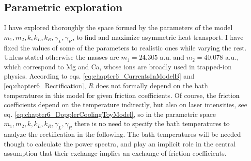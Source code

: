 \subsection{Parametric exploration}
%
%
%
I have explored thoroughly the space formed by the parameters of the model $m_1,m_2,k,k_L,k_R,\gamma_L,\gamma_R$, to find
and maximize asymmetric heat transport. I have fixed the values of some of the parameters to realistic ones while varying the rest. Unless stated otherwise the masses are
$m_1 = 24.305$ a.u. and $m_2 = 40.078$ a.u., which correspond to Mg and Ca, whose ions are broadly used in trapped-ion physics. According to eqs. \eqref{eq:chapter6_CurrentsInModelB} and \eqref{eq:chapter6_Rectification}, $R$ does not formally depend on the bath temperatures in this model for given friction coefficients. Of course, the friction coefficients depend on the temperature indirectly, but also on laser intensities, see eq. \eqref{eq:chapter6_DopplerCoolingToyModel}, so in the parametric space $m_1,m_2,k,k_L,k_R,\gamma_L,\gamma_R$ there is no need to specify the bath temperatures to analyze the rectification in the following. The bath temperatures will be needed though to calculate the power spectra, and play an implicit role in the central assumption that their exchange implies an exchange of friction coefficients.

